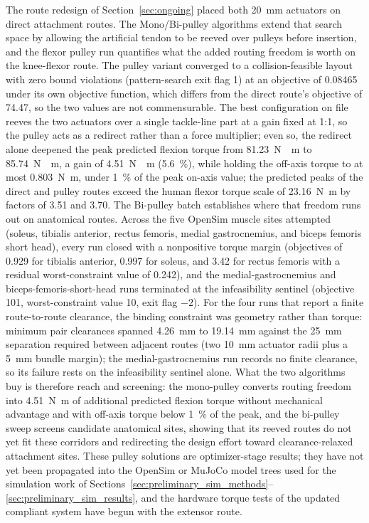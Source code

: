 The route redesign of Section~\ref{sec:ongoing} placed both \qty{20}{\mm} actuators on direct attachment routes. The Mono/Bi-pulley algorithms extend that search space by allowing the artificial tendon to be reeved over pulleys before insertion, and the flexor pulley run quantifies what the added routing freedom is worth on the knee-flexor route. The pulley variant converged to a collision-feasible layout with zero bound violations (pattern-search exit flag 1) at an objective of 0.08465 under its own objective function, which differs from the direct route's objective of 74.47, so the two values are not commensurable. The best configuration on file reeves the two actuators over a single tackle-line part at a gain fixed at 1:1, so the pulley acts as a redirect rather than a force multiplier; even so, the redirect alone deepened the peak predicted flexion torque from \qty{81.23}{\newton\cdot\meter} to \qty{85.74}{\newton\cdot\meter}, a gain of \qty{4.51}{\newton\cdot\meter} (\qty{5.6}{\percent}), while holding the off-axis torque to at most \qty{0.803}{\newton\meter}, under \qty{1}{\percent} of the peak on-axis value; the predicted peaks of the direct and pulley routes exceed the human flexor torque scale of \qty{23.16}{\newton\meter} by factors of 3.51 and 3.70. The Bi-pulley batch establishes where that freedom runs out on anatomical routes. Across the five OpenSim muscle sites attempted (soleus, tibialis anterior, rectus femoris, medial gastrocnemius, and biceps femoris short head), every run closed with a nonpositive torque margin (objectives of 0.929 for tibialis anterior, 0.997 for soleus, and 3.42 for rectus femoris with a residual worst-constraint value of 0.242), and the medial-gastrocnemius and biceps-femoris-short-head runs terminated at the infeasibility sentinel (objective 101, worst-constraint value 10, exit flag $-2$). For the four runs that report a finite route-to-route clearance, the binding constraint was geometry rather than torque: minimum pair clearances spanned \qty{4.26}{\mm} to \qty{19.14}{\mm} against the \qty{25}{\mm} separation required between adjacent routes (two \qty{10}{\mm} actuator radii plus a \qty{5}{\mm} bundle margin); the medial-gastrocnemius run records no finite clearance, so its failure rests on the infeasibility sentinel alone. What the two algorithms buy is therefore reach and screening: the mono-pulley converts routing freedom into \qty{4.51}{\newton\meter} of additional predicted flexion torque without mechanical advantage and with off-axis torque below \qty{1}{\percent} of the peak, and the bi-pulley sweep screens candidate anatomical sites, showing that its reeved routes do not yet fit these corridors and redirecting the design effort toward clearance-relaxed attachment sites. These pulley solutions are optimizer-stage results; they have not yet been propagated into the OpenSim or MuJoCo model trees used for the simulation work of Sections~\ref{sec:preliminary_sim_methods}--\ref{sec:preliminary_sim_results}, and the hardware torque tests of the updated compliant system have begun with the extensor route.

